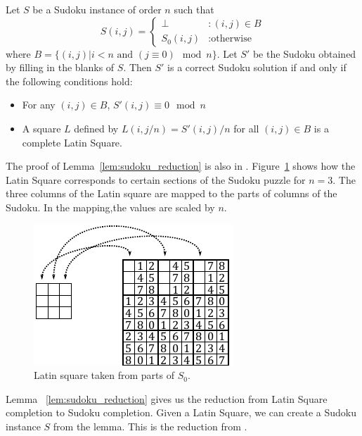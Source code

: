 \documentclass[runningheads,a4paper]{llncs}
\begin{document}
\begin{lemma}
\label{lem:sudoku_reduction}
Let $S$ be a Sudoku instance of order $n$ such that
\begin{displaymath}
S(i,j) = \left\{
\begin{array}{lr}
\perp & : (i,j) \in B\\
S_0 (i,j) & : \text{otherwise}
\end{array}
\right.
\end{displaymath}
where $B = \{ (i,j) | i < n \text{ and } (j \equiv 0) \mod n \}$. Let $S'$ be the Sudoku obtained by filling in the blanks of $S$. Then $S'$ is a correct Sudoku solution if and only if the following conditions hold:
\begin{itemize}
\item For any $(i,j) \in B$, $S'(i,j) \equiv 0 \mod n$
\item A square $L$ defined by $L(i, j/n) = S'(i,j)/n$ for all $(i, j) \in B$ is a complete Latin Square.
\end{itemize}
\end{lemma}

The proof of Lemma~\ref{lem:sudoku_reduction} is also in \cite{takayuki2003complexity}. Figure~\ref{fig:latinsquare_to_sudoku} shows how the Latin Square corresponds to certain sections of the Sudoku puzzle for $n=3$. The three columns of the Latin square are mapped to the parts of columns of the Sudoku. In the mapping,the values are scaled by $n$. 

\begin{figure}
\centering
\label{fig:latinsquare_to_sudoku}
\includegraphics[width=0.7\linewidth]{latinsquare_to_sudoku.pdf}
\caption{Latin square taken from parts of $S_0$.}
\end{figure}

Lemma ~\ref{lem:sudoku_reduction} gives us the reduction from Latin Square completion to Sudoku completion. Given a Latin Square, we can create a Sudoku instance $S$ from the lemma. This is the reduction from \cite{takayuki2003complexity}.
\end{document}
